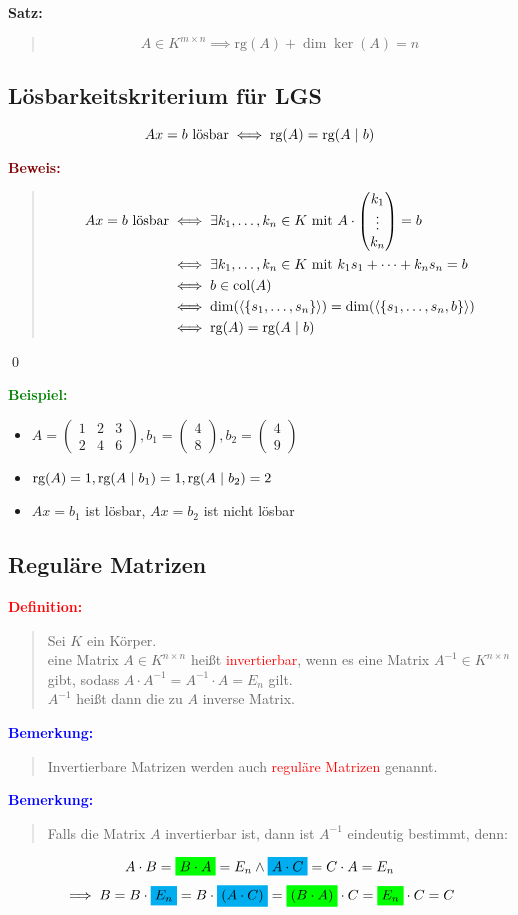 \documentclass{article}
\newcommand{\smsp}{\phantom{\hspace{3px}}}
\newcommand{\red}[1]{\textcolor{red}{#1}}
\newcommand{\blue}[1]{\textcolor{blue}{#1}}
\newcommand{\green}[1]{\textcolor{green}{#1}}
\newcommand{\dgr}[1]{\textcolor{dgr}{#1}}
\newcommand{\maroon}[1]{\textcolor{maroon}{#1}}
\newcommand{\hcyan}[1]{\colorbox{cyan}{#1}}
\newcommand{\hgreen}[1]{\colorbox{green}{#1}}
\newcommand{\ex}{\green{\textbf{Beispiel: }}}
\newcommand{\de}[1]{\red{\textbf{Definition: }}\begin{quote}#1\end{quote}}
\newcommand{\an}[1]{\blue{\textbf{Bemerkung: }}\begin{quote}#1\end{quote}}
\newcommand{\se}[1]{\dgr{\textbf{Satz: }}\begin{quote}#1\end{quote}}
\newcommand{\pr}[1]{\maroon{\textbf{Beweis: }}\begin{quote}#1\end{quote}\qed}
\renewcommand{\st}{\smsp | \smsp}
\newcommand{\vvec}[2]{\begin{pmatrix}#1\\#2\end{pmatrix}}
\newcommand{\vvvec}[3]{\begin{pmatrix}#1\\#2\\#3\end{pmatrix}}
\newcommand{\spann}[1]{\left\langle#1\right\rangle}
\newcommand{\col}{\text{col}}
\newcommand{\rg}{\text{rg}}
\begin{document}
\se{
    \vspace{-15px}
    \[
        A \in K^{m \times n} \implies \rg(A) + \dim\ker(A) = n
    \]
}

\subsection{Lösbarkeitskriterium für LGS}
\[
    Ax = b \text{ lösbar} \iff \rg(A) = \rg(A \st b)
\]

\pr{
    \begin{align*}
        Ax = b \text{ lösbar} &\iff \exists k_1,\dots,k_n \in K \text{ mit } A \cdot \vvvec{k_1}{\vdots}{k_n} = b\\
        &\iff \exists k_1,\dots,k_n \in K \text{ mit } k_1s_1 + \dots + k_ns_n = b\\
        &\iff b \in \col(A)\\
        &\iff \dim(\spann{\{s_1,\dots,s_n\}}) = \dim(\spann{\{s_1,\dots,s_n,b\}})\\
        &\iff \rg(A) = \rg(A \st b)
    \end{align*}
}

\ex
\begin{itemize}
    \item $A = \begin{pmatrix}
        1 & 2 & 3\\
        2 & 4 & 6
    \end{pmatrix}, b_1 = \vvec{4}{8}, b_2 = \vvec{4}{9}$
    \item $\rg(A) = 1, \rg(A \st b_1) = 1, \rg(A \st b_2) = 2$
    \item $Ax = b_1$ ist lösbar, $Ax = b_2$ ist nicht lösbar
\end{itemize}

\subsection{Reguläre Matrizen}

\de{
    Sei $K$ ein Körper.\\
    eine Matrix $A \in K^{n \times n}$ heißt \red{invertierbar}, wenn es eine Matrix $A^{-1} \in K^{n \times n}$ gibt, sodass $A \cdot A^{-1} = A^{-1} \cdot A = E_n$ gilt.\\
    $A^{-1}$ heißt dann die zu $A$ inverse Matrix.
}
\an{
    Invertierbare Matrizen werden auch \red{reguläre Matrizen} genannt.
}

\an{
    Falls die Matrix $A$ invertierbar ist, dann ist $A^{-1}$ eindeutig bestimmt, denn:
}
\[
    A \cdot B = \hgreen{$B \cdot A$} = E_n \land \hcyan{$A \cdot C$} = C \cdot A = E_n
\]
\[
    \implies B = B \cdot \hcyan{$E_n$} = B \cdot \hcyan{$(A \cdot C)$} = \hgreen{$(B \cdot A)$} \cdot C = \hgreen{$E_n$} \cdot C = C
\]
\end{document}
